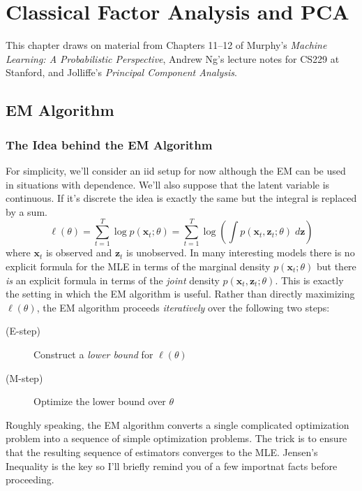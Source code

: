 \chapter{Classical Factor Analysis and PCA}

This chapter draws on material from Chapters 11--12 of Murphy's \emph{Machine Learning: A Probabilistic Perspective}, Andrew Ng's lecture notes for CS229 at Stanford, and Jolliffe's \emph{Principal Component Analysis}.

\section{EM Algorithm}


\subsection{The Idea behind the EM Algorithm}
For simplicity, we'll consider an iid setup for now although the EM can be used in situations with dependence. We'll also suppose that the latent variable is continuous. If it's discrete the idea is exactly the same but the integral is replaced by a sum.
	$$\ell(\theta) = \sum_{t=1}^T \log p(\textbf{x}_t;\theta) = \sum_{t=1}^T \log \left(\int p(\textbf{x}_t,	\textbf{z}_t;\theta)\; d \textbf{z} \right)$$
where $\mathbf{x}_t$ is observed and $\mathbf{z}_t$ is unobserved. In many interesting models there is no explicit formula for the MLE in terms of the marginal density $p(\mathbf{x}_t;\theta)$ but there \emph{is} an explicit formula in terms of the \emph{joint} density $p(\mathbf{x}_t,\mathbf{z}_t;\theta)$. This is exactly the setting in which the EM algorithm is useful. Rather than directly maximizing $\ell(\theta)$, the EM algorithm proceeds \emph{iteratively} over the following two steps:
	\begin{description}
		\item[(E-step)] Construct a \emph{lower bound} for $\ell(\theta)$
		\item[(M-step)] Optimize the lower bound over $\theta$
	\end{description}
Roughly speaking, the EM algorithm converts a single complicated optimization problem into a sequence of simple optimization problems. The trick is to ensure that the resulting sequence of estimators converges to the MLE. Jensen's Inequality is the key so I'll briefly remind you of a few importnat facts before proceeding. 

